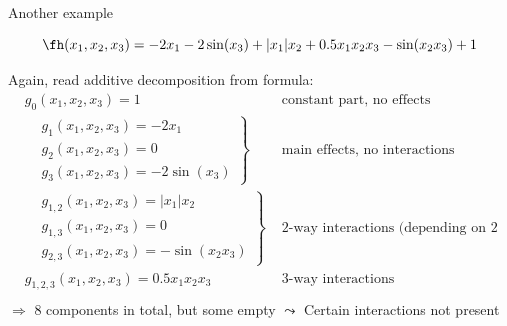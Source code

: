 \documentclass[11pt,compress,t,notes=noshow, aspectratio=169, xcolor=table]{beamer}
\begin{document}
\begin{frame}{Another example}

    \begin{example}


        \begin{equation*}
            \fh(x_1, x_2, x_3) = - 2x_1 - 2\sin(x_3) + |x_1|x_2 + 0.5 x_1 x_2 x_3 - \sin(x_2 x_3) + 1
        \end{equation*}

        Again, read additive decomposition from formula:
        \begin{equation}\label{eq:func_decomp_second_min_example}
        \begin{aligned}
            & g_0(x_1, x_2, x_3) = 1 & \text{ constant part, no effects}  \\
            &
            \left.\begin{aligned}
                & g_1(x_1, x_2, x_3) = - 2x_1 \\
                & g_2(x_1, x_2, x_3) = 0 \\
                & g_3(x_1, x_2, x_3) = - 2\sin(x_3)
            \end{aligned}\right\}
                & \text{ main effects, no interactions}  \\
            &
            \left.\begin{aligned}
                & g_{1,2}(x_1, x_2, x_3) = |x_1|x_2 \\
                & g_{1,3}(x_1, x_2, x_3) = 0 \\
                & g_{2,3}(x_1, x_2, x_3) = - \sin(x_2 x_3)
            \end{aligned}\right\}
                & \text{ 2-way interactions (depending on 2 features)}  \\
            & g_{1,2,3}(x_1, x_2, x_3) = 0.5 x_1 x_2 x_3 & \text{ 3-way interactions}  \\
        \end{aligned}
        \end{equation}
        \(\Rightarrow\) 8 components in total, but some empty $\leadsto$ Certain interactions not present
        
    \end{example}
    
\end{frame}
\end{document}
